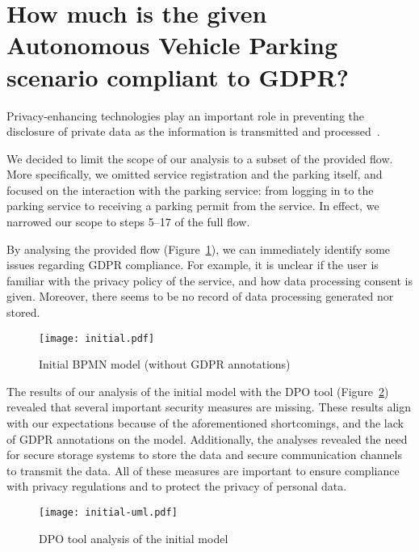 \section{How much is the given Autonomous Vehicle Parking scenario compliant to
GDPR?}

Privacy-enhancing technologies play an important role in preventing the
disclosure of private data as the information is transmitted and
processed~\cite[1-2]{10.1007/s10270-019-00718-z}.

We decided to limit the scope of our analysis to a subset of the provided flow.
More specifically, we omitted service registration and the parking itself, and
focused on the interaction with the parking service: from logging in to the
parking service to receiving a parking permit from the service. In effect, we
narrowed our scope to steps 5--17 of the full flow.

By analysing the provided flow (Figure~\ref{fig:initial-model}), we can
immediately identify some issues regarding GDPR compliance. For example, it is
unclear if the user is familiar with the privacy policy of the service, and how
data processing consent is given. Moreover, there seems to be no record of data
processing generated nor stored.

\begin{figure}[ht]
\begin{center}
  \texttt{[image: initial.pdf]}
  \caption{Initial BPMN model (without GDPR annotations)}
  \label{fig:initial-model}
\end{center}
\end{figure}

The results of our analysis of the initial model with the DPO tool
(Figure~\ref{fig:initial-uml})~\cite{dpotool} revealed that several important
security measures are missing. These results align with our expectations because
of the aforementioned shortcomings, and the lack of GDPR annotations on the
model. Additionally, the analyses revealed the need for secure storage systems
to store the data and secure communication channels to transmit the data. All of
these measures are important to ensure compliance with privacy regulations and
to protect the privacy of personal data.


\begin{figure}[ht]
\begin{center}
  \texttt{[image: initial-uml.pdf]}
  \caption{DPO tool analysis of the initial model}
  \label{fig:initial-uml}
\end{center}
\end{figure}

